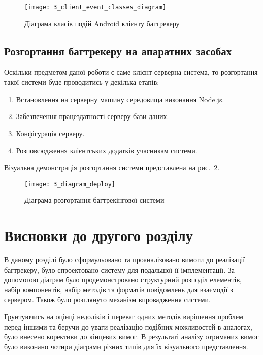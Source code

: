 \documentclass[../main.tex]{subfiles}
\begin{document}
		\begin{figure}[H]
			\centering
			\texttt{[image: 3\_client\_event\_classes\_diagram]}
			\caption{Діаграма класів подій Android клієнту багтрекеру}
			\label{client_events}
		\end{figure}
	
	\subsection{Розгортання багтрекеру на апаратних засобах}
	
		Оскільки предметом даної роботи є саме клієнт-серверна система, то розгортання такої системи буде проводитись у декілька етапів:
		\begin{enumerate}
			\item Встановлення на серверну машину середовища виконання Node.js.
			\item Забезпечення працездатності серверу бази даних.
			\item Конфігурація серверу.
			\item Розповсюдження клієнтських додатків учасникам системи.
		\end{enumerate}
		
		Візуальна демонстрація розгортання системи представлена на рис.~\ref{diagram_deploy}. %
		
		\begin{figure}[H]
			\centering
			\texttt{[image: 3\_diagram\_deploy]}
			\caption{Діаграма розгортання багтрекінгової системи}
			\label{diagram_deploy}
		\end{figure}

\section{Висновки до другого розділу}
	В даному розділі було сформульовано та проаналізовано вимоги до реалізації багтрекеру, було спроектовано систему для подальшої її імплементації. За допомогою діаграм було продемонстровано структурний розподіл елементів, набір компонентів, набір методів та форматів повідомлень для взаємодії з сервером. Також було розглянуто механізм впровадження системи. 
	
	Грунтуючись на оцінці недоліків і переваг одних методів вирішення проблем перед іншими та беручи до уваги реалізацію подібних можливостей в аналогах, було внесено корективи до кінцевих вимог. В результаті аналізу отриманих вимог було виконано чотири діаграми різних типів для їх візуального представлення.
	
\end{document}
